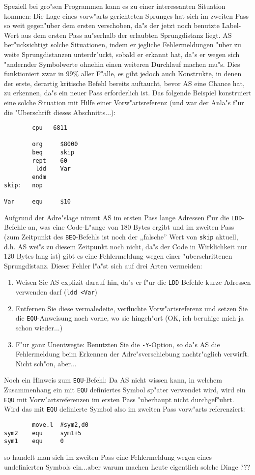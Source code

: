 \documentclass[12pt,a4paper,twoside]{report}
\newcommand{\tty}[1]{{\tt #1}}
\begin{document}
Speziell bei gro"sen Programmen kann es zu einer interessanten Situation
kommen: Die Lage eines vorw"arts gerichteten Sprunges hat sich
im zweiten Pass so weit gegen"uber dem ersten verschoben, da"s der
jetzt noch benutzte Label-Wert aus dem ersten Pass au"serhalb der
erlaubten Sprungdistanz liegt.  AS ber"ucksichtigt solche Situationen,
indem er jegliche Fehlermeldungen "uber zu weite Sprungdistanzen unterdr"uckt,
sobald er erkannt hat, da"s er wegen sich "andernder Symbolwerte ohnehin
einen weiteren Durchlauf machen mu"s.  Dies funktioniert zwar in 99\%
aller F"alle, es gibt jedoch auch Konstrukte, in denen der erste, derartig
kritische Befehl bereits auftaucht, bevor AS eine Chance hat, zu erkennen,
da"s ein neuer Pass erforderlich ist.  Das folgende Beispiel konstruiert
eine solche Situation mit Hilfe einer Vorw"artsreferenz (und war der
Anla"s f"ur die "Uberschrift dieses Abschnitts...):
\begin{verbatim}
        cpu   6811

        org     $8000
        beq     skip
        rept    60
         ldd    Var
        endm
skip:   nop

Var     equ     $10
\end{verbatim}
Aufgrund der Adre"slage nimmt AS im ersten Pass lange Adressen f"ur die
\tty{LDD}-Befehle an, was eine Code-L"ange von 180 Bytes ergibt und im
zweiten Pass (zum Zeitpunkt des \tty{BEQ}-Befehls ist noch der ,,falsche''
Wert von \tty{skip} aktuell, d.h. AS wei"s zu diesem Zeitpunkt noch nicht,
da"s der Code in Wirklichkeit nur 120 Bytes lang ist) gibt es eine
Fehlermeldung wegen einer "uberschrittenen Sprungdistanz.  Dieser Fehler
l"a"st sich auf drei Arten vermeiden:
\begin{enumerate}
\item{Weisen Sie AS explizit darauf hin, da"s er f"ur die \tty{LDD}-Befehle
      kurze Adressen verwenden darf (\tty{ldd <Var})}
\item{Entfernen Sie diese vermaledeite, verfluchte Vorw"artsreferenz und
      setzen Sie die \tty{EQU}-Anweisung nach vorne, wo sie hingeh"ort
      (OK, ich beruhige mich ja schon wieder...)}
\item{F"ur ganz Unentwegte: Benutzten Sie die \tty{-Y}-Option, so da"s AS die
      Fehlermeldung beim Erkennen der Adre"sverschiebung nachtr"aglich
      verwirft.  Nicht sch"on, aber...}
\end{enumerate}
Noch ein Hinweis zum \tty{EQU}-Befehl:  Da AS nicht wissen kann, in welchem
Zusammenhang ein mit \tty{EQU} definiertes Symbol sp"ater verwendet wird,
wird ein \tty{EQU} mit Vorw"artsreferenzen im ersten Pass "uberhaupt nicht
durchgef"uhrt.  Wird das mit \tty{EQU} definierte Symbol also im zweiten
Pass vorw"arts referenziert:
\begin{verbatim}
        move.l  #sym2,d0
sym2    equ     sym1+5
sym1    equ     0
\end{verbatim}
so handelt man sich im zweiten Pass eine Fehlermeldung wegen eines
undefinierten Symbols ein...aber warum machen Leute eigentlich solche
Dinge ???
\end{document}
